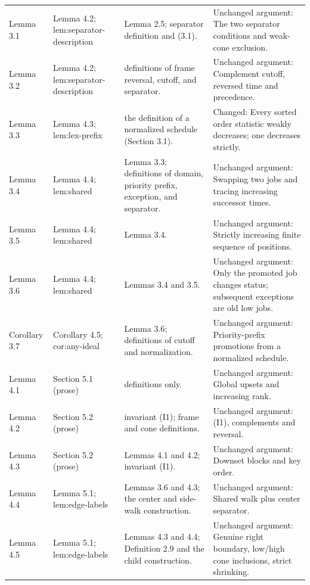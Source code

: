 \documentclass[11pt,a4paper]{article}
\theoremstyle{plain}
\theoremstyle{definition}
\begin{document}
{\begin{longtable}{@{}L{2.6cm}L{3.2cm}L{3.7cm}L{5.1cm}@{}}
Lemma 3.1 & Lemma 4.2; \textsf{lem:\allowbreak separator-\allowbreak description} & Lemma 2.5; separator definition and (3.1). & Unchanged argument: The two separator conditions and weak-cone exclusion.\\[3pt]
Lemma 3.2 & Lemma 4.2; \textsf{lem:\allowbreak separator-\allowbreak description} & definitions of frame reversal, cutoff, and separator. & Unchanged argument: Complement cutoff, reversed time and precedence.\\[3pt]
Lemma 3.3 & Lemma 4.3; \textsf{lem:\allowbreak lex-\allowbreak prefix} & the definition of a normalized schedule (Section 3.1). & Changed: Every sorted order statistic weakly decreases; one decreases strictly.\\[3pt]
Lemma 3.4 & Lemma 4.4; \textsf{lem:\allowbreak shared} & Lemma 3.3; definitions of domain, priority prefix, exception, and separator. & Unchanged argument: Swapping two jobs and tracing increasing successor times.\\[3pt]
Lemma 3.5 & Lemma 4.4; \textsf{lem:\allowbreak shared} & Lemma 3.4. & Unchanged argument: Strictly increasing finite sequence of positions.\\[3pt]
Lemma 3.6 & Lemma 4.4; \textsf{lem:\allowbreak shared} & Lemmas 3.4 and 3.5. & Unchanged argument: Only the promoted job changes status; subsequent exceptions are old low jobs.\\[3pt]
Corollary 3.7 & Corollary 4.5; \textsf{cor:\allowbreak any-\allowbreak ideal} & Lemma 3.6; definitions of cutoff and normalization. & Unchanged argument: Priority-prefix promotions from a normalized schedule.\\[3pt]
Lemma 4.1 & Section 5.1 (prose) & definitions only. & Unchanged argument: Global upsets and increasing rank.\\[3pt]
Lemma 4.2 & Section 5.2 (prose) & invariant (I1); frame and cone definitions. & Unchanged argument: (I1), complements and reversal.\\[3pt]
Lemma 4.3 & Section 5.2 (prose) & Lemmas 4.1 and 4.2; invariant (I1). & Unchanged argument: Downset blocks and key order.\\[3pt]
Lemma 4.4 & Lemma 5.1; \textsf{lem:\allowbreak edge-\allowbreak labels} & Lemmas 3.6 and 4.3; the center and side-walk construction. & Unchanged argument: Shared walk plus center separator.\\[3pt]
Lemma 4.5 & Lemma 5.1; \textsf{lem:\allowbreak edge-\allowbreak labels} & Lemmas 4.3 and 4.4; Definition 2.9 and the child construction. & Unchanged argument: Genuine right boundary, low/high cone inclusions, strict shrinking.\\[3pt]

\end{longtable}}
\end{document}
